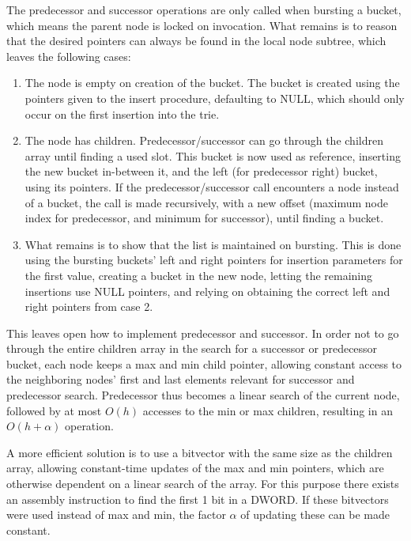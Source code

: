 The predecessor and successor operations are only called when bursting a bucket,
which means the parent node is locked on invocation. What remains is to reason
that the desired pointers can always be found in the local node subtree,
which leaves the following cases:
\begin{enumerate}
    \item The node is empty on creation of the bucket. The bucket is
    created using the pointers given to the insert procedure, defaulting to
    {\keyword NULL}, which should only occur on the first insertion into the trie.
    \item The node has children. Predecessor/successor can go through
    the children array until finding a used slot. This bucket is now used as
    reference, inserting the new bucket in-between it, and the left (for
    predecessor right) bucket, using its pointers. If the predecessor/successor
    call encounters a node instead of a bucket, the call is made recursively,
    with a new offset (maximum node index for predecessor, and minimum for successor),
    until finding a bucket.
    \item  What remains is to show that the list is maintained on bursting.
    This is done using the bursting buckets' left and right pointers for insertion
    parameters for the first value, creating a bucket in the new node, letting the
    remaining insertions use {\keyword NULL} pointers, and relying on obtaining the
    correct left and right pointers from case 2.
\end{enumerate}

This leaves open how to implement {\keyword predecessor} and {\keyword
successor}. In order not to go through the entire children array in the search
for a {\keyword successor} or {\keyword predecessor} bucket, each node keeps a
{\keyword max} and {\keyword min} child pointer, allowing constant access to
the neighboring nodes' first and last elements relevant for successor and
predecessor search. Predecessor thus becomes a linear search of the current
node, followed by at most $O(h)$ accesses to the {\keyword min} or {\keyword
max} children, resulting in an $O(h+\alpha)$ operation.

A more efficient solution is to use a bitvector with the same size as the
children array, allowing constant-time updates of the {\keyword max} and
{\keyword min} pointers, which are otherwise dependent on a linear search of
the array. For this purpose there exists an assembly instruction to find the
first 1 bit in a DWORD. If these bitvectors were used instead of {\keyword max}
and {\keyword min}, the factor $\alpha$ of updating these can be made constant.


